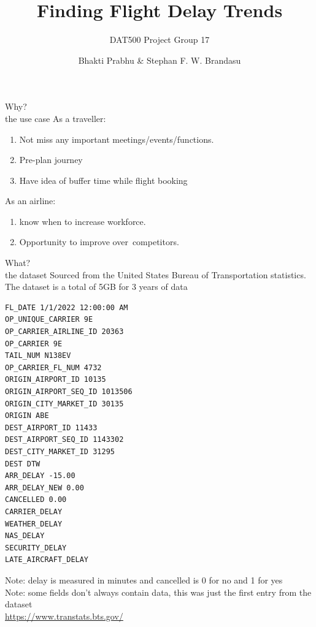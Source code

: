 \documentclass[10pt]{beamer}
\title{Finding Flight Delay Trends}
\subtitle{DAT500 Project Group 17}
\date{}
\author{Bhakti Prabhu \& Stephan F. W. Brandasu}
\institute{Faculty of Science and Technology}
\begin{document}
\maketitle

\begin{frame}{Why? \\ \small the use case}
As a traveller: 
\begin{enumerate}
    \item Not miss any important meetings/events/functions.
    \item Pre-plan journey
    \item Have idea of buffer time while flight booking
\end{enumerate}

As an airline:
\begin{enumerate}
    \item  know when to increase workforce.
    \item Opportunity to improve over competitors.
\end{enumerate}

\end{frame}


\begin{frame}[fragile]{What? \\ \small the dataset}
Sourced from the United States Bureau of Transportation statistics. The dataset is a total of 5GB for 3 years of data

\begin{lstlisting}
FL_DATE 1/1/2022 12:00:00 AM
OP_UNIQUE_CARRIER 9E
OP_CARRIER_AIRLINE_ID 20363
OP_CARRIER 9E
TAIL_NUM N138EV
OP_CARRIER_FL_NUM 4732
ORIGIN_AIRPORT_ID 10135
ORIGIN_AIRPORT_SEQ_ID 1013506
ORIGIN_CITY_MARKET_ID 30135
ORIGIN ABE
DEST_AIRPORT_ID 11433
DEST_AIRPORT_SEQ_ID 1143302
DEST_CITY_MARKET_ID 31295
DEST DTW
ARR_DELAY -15.00
ARR_DELAY_NEW 0.00
CANCELLED 0.00
CARRIER_DELAY 
WEATHER_DELAY 
NAS_DELAY 
SECURITY_DELAY 
LATE_AIRCRAFT_DELAY
\end{lstlisting}

\tiny Note: delay is measured in minutes and cancelled is 0 for no and 1 for yes 
\\ 
Note: some fields don't always contain data, this was just the first entry from the dataset
\\
\url{https://www.transtats.bts.gov/}
\end{frame}
\end{document}
